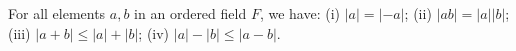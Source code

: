 For all elements $a, b$ in an ordered field $F$, we have:
(i) $|a| = |-a|$;
(ii) $|ab| = |a| |b|$;
(iii) $|a + b| \leq |a| + |b|$;
(iv) $|a| - |b| \leq |a - b|$.